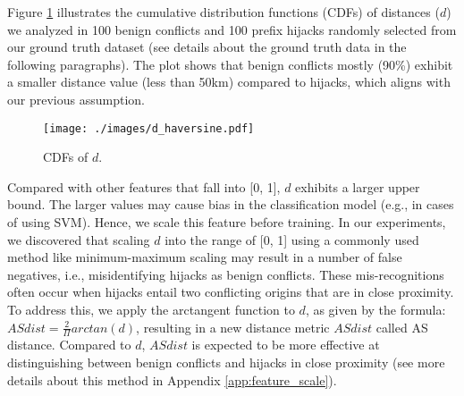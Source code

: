 Figure \ref{fig:d_cdf} illustrates the cumulative distribution functions (CDFs) of distances ($d$) we analyzed in 100 benign conflicts and 100 prefix hijacks randomly selected from our ground truth dataset (see details about the ground truth data in the following paragraphs).
The plot shows that benign conflicts mostly (90\%) exhibit a smaller distance value (less than 50km) compared to hijacks, which aligns with our previous assumption.
\begin{figure}[t!]
    \centering
    \texttt{[image: ./images/d\_haversine.pdf]}
    \vspace{-15pt}
    \caption{\small CDFs of $d$.}
    \label{fig:d_cdf}
\end{figure}

Compared with other features that fall into [0, 1], $d$ exhibits a larger upper bound. The larger values may cause bias in the classification model (e.g., in cases of using SVM). Hence, we scale this feature before training.
In our experiments, we discovered that scaling $d$ into the range of [0, 1] using a commonly used method like minimum-maximum scaling may result in a number of false negatives, i.e., misidentifying hijacks as benign conflicts. These mis-recognitions often occur when hijacks entail two conflicting origins that are in close proximity.
To address this, we apply the arctangent function to $d$, as given by the formula: {$ASdist = \frac{2}{\Pi}arctan(d)$}, resulting in a new distance metric $ASdist$ called AS distance.
Compared to $d$, $ASdist$ is expected to be more effective at distinguishing between benign conflicts and hijacks in close proximity (see more details about this method in Appendix \ref{app:feature_scale}).
\vspace{-5pt}
